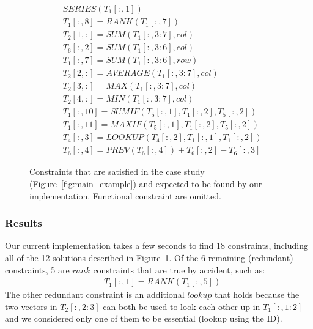 \documentclass{ecai}
\newcommand{\range}[3]{\ensuremath{#1[#2,#3]}}
\newcommand{\rangeto}[2]{#1{:}#2}
\newcommand{\rangeall}{:}
\newcommand{\eccalc}[2]{\ensuremath{#1 = #2}}
\newcommand{\ecrank}[2]{\eccalc{#1}{\mathit{RANK}(#2)}}
\newcommand{\eclookupf}[4]{\ensuremath{\mathit{LOOKUP}_{\mathit{#4}}(#1, #2, #3)}}
\newcommand{\eclookup}[4]{\eccalc{#1}{\eclookupf{#2}{#3}{#4}{}}}
\newcommand{\ecaggc}[3]{\eccalc{#2}{\mathit{#1}(#3, col)}}
\newcommand{\ecsumc}[2]{\eccalc{#1}{\mathit{SUM}(#2, col)}}
\newcommand{\ecsumr}[2]{\eccalc{#1}{\mathit{SUM}(#2, row)}}
\newcommand{\ecaggif}[5]{\eccalc{#2}{\mathit{#1IF}(#3, #4, #5)}}
\begin{document}
\begin{figure}
  {\small
    \begin{align*}
      & SERIES(\range{T_{1}}{\rangeall}{1}) \\
%
      & \ecrank{\range{T_{1}}{\rangeall}{8}}{\range{T_{1}}{\rangeall}{7}} \\
%
      & \ecsumc{\range{T_{2}}{1}{\rangeall}}{\range{T_{1}}{\rangeall}{\rangeto{3}{7}}} \\
%
      & \ecsumc{\range{T_{6}}{\rangeall}{2}}{\range{T_{1}}{\rangeall}{\rangeto{3}{6}}} \\
%
      & \ecsumr{\range{T_{1}}{\rangeall}{7}}{\range{T_{1}}{\rangeall}{\rangeto{3}{6}}} \\
%
      & \ecaggc{AVERAGE}{\range{T_{2}}{2}{\rangeall}}{\range{T_{1}}{\rangeall}{\rangeto{3}{7}}} \\
%
      & \ecaggc{MAX}{\range{T_{2}}{3}{\rangeall}}{\range{T_{1}}{\rangeall}{\rangeto{3}{7}}} \\
%
      & \ecaggc{MIN}{\range{T_{2}}{4}{\rangeall}}{\range{T_{1}}{\rangeall}{\rangeto{3}{7}}} \\
%
      & \ecaggif{SUM}{\range{T_{1}}{\rangeall}{10}}{\range{T_{5}}{\rangeall}{1}}{\range{T_{1}}{\rangeall}{2}}{\range{T_{5}}{\rangeall}{2}} \\
%
      & \ecaggif{MAX}{\range{T_{1}}{\rangeall}{11}}{\range{T_{5}}{\rangeall}{1}}{\range{T_{1}}{\rangeall}{2}}{\range{T_{5}}{\rangeall}{2}} \\
%
      & \eclookup{\range{T_{4}}{\rangeall}{3}}{\range{T_{4}}{\rangeall}{2}}{\range{T_{1}}{\rangeall}{1}}{\range{T_{1}}{\rangeall}{2}} \\
%
      & \range{T_{6}}{\rangeall}{4} = PREV(\range{T_{6}}{\rangeall}{4}) + \range{T_{6}}{\rangeall}{2} - \range{T_{6}}{\rangeall}{3}
    \end{align*}
  }
  \caption{Constraints that are satisfied in the case study (Figure~\ref{fig:main_example}) and expected to be found by our implementation. Functional constraint are omitted.}
  \label{fig:sol_example}
\end{figure}

\subsubsection{Results}
Our current implementation takes a few seconds to find 18 constraints, including all of the 12 solutions described in Figure~\ref{fig:sol_example}.
Of the 6 remaining (redundant) constraints, 5 are $\mathit{rank}$ constraints that are true by accident, such as: \begin{align*}
  & \ecrank{\range{T_1}{\rangeall}{1}}{\range{T_1}{\rangeall}{5}}
\end{align*}
The other redundant constraint is an additional $\mathit{lookup}$ that holds because the two vectors in \range{T_2}{\rangeall}{\rangeto{2}{3}} can both be used to look each other up in \range{T_1}{\rangeall}{\rangeto{1}{2}} and we considered only one of them to be essential (lookup using the ID).
\end{document}
